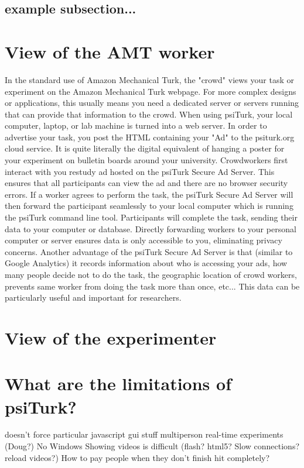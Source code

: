 \documentclass[jou,apacite]{apa6}
\begin{document}
\subsection{example subsection...}

\section{View of the AMT worker}


In the standard use of Amazon Mechanical Turk, the "crowd" views your task or experiment on the Amazon Mechanical Turk webpage.
For more complex designs or applications, this usually means you need a dedicated server or servers running that can provide that information to the crowd.
When using psiTurk, your local computer, laptop, or lab machine is turned into a web server.
In order to advertise your task, you post the HTML containing your "Ad" to the psiturk.org cloud service.
It is quite literally the digital equivalent of hanging a poster for your experiment on bulletin boards around your university.
Crowdworkers first interact  with you restudy ad hosted on the psiTurk Secure Ad Server.
This ensures that all participants can view the ad and there are no browser security errors.
If a worker agrees to perform the task, the psiTurk Secure Ad Server will then forward the participant seamlessly to your local computer which is running the psiTurk command line tool.
Participants will complete the task, sending their data to your computer or database.
Directly forwarding workers to your personal computer or server ensures data is only accessible to you, eliminating privacy concerns.
Another advantage of the psiTurk Secure Ad Server is that (similar to Google Analytics) it records information about who is accessing your ads, how many people decide not to do the task, the geographic location of crowd workers, prevents same worker from doing the task more than once, etc... 
This data can be particularly useful and important for researchers. 


\section{View of the experimenter}

\section{What are the limitations of psiTurk?}
doesn't force particular javascript gui stuff
multiperson real-time experiments (Doug?) 
No Windows
Showing videos is difficult (flash? html5? Slow connections? reload videos?)
How to pay people when they don't finish hit completely?
\end{document}
